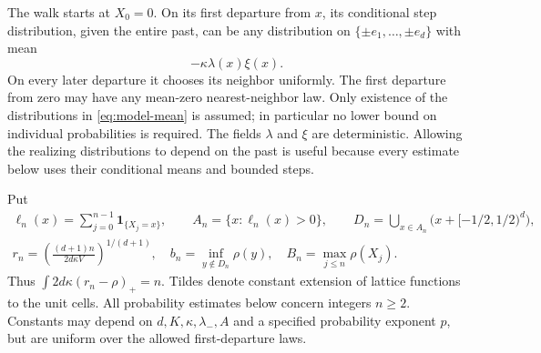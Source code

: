 \documentclass[11pt]{amsart}
\theoremstyle{plain}
\theoremstyle{definition}
\numberwithin{equation}{section}
\newcommand{\ind}{\mathbf1}
\begin{document}
The walk starts at $X_0=0$. On its first departure from $x$, its
conditional step distribution, given the entire past, can be any
distribution on $\{\pm e_1,\ldots,\pm e_d\}$ with mean
\begin{equation}\label{eq:model-mean}
 -\kappa\lambda(x)\xi(x).
\end{equation}
On every later departure it chooses its neighbor uniformly. The
first departure from zero may have any mean-zero nearest-neighbor law.
Only existence of the distributions in \eqref{eq:model-mean} is
assumed; in particular no lower bound on individual probabilities is
required. The fields $\lambda$ and $\xi$ are deterministic. Allowing
the realizing distributions to depend on the past is useful because
every estimate below uses their conditional means and bounded steps.

Put
\begin{gather}
 \ell_n(x)=\sum_{j=0}^{n-1}\ind_{\{X_j=x\}},\qquad
 A_n=\{x:\ell_n(x)>0\},\qquad
 D_n=\bigcup_{x\in A_n}\bigl(x+[-1/2,1/2)^d\bigr),\label{eq:range-def}\\
 r_n=\left(\frac{(d+1)n}{2d\kappa V}\right)^{1/(d+1)},\quad
 b_n=\inf_{y\notin D_n}\rho(y),\quad
 B_n=\max_{j\le n}\rho(X_j).\label{eq:radius-def}
\end{gather}
Thus $\int 2d\kappa(r_n-\rho)_+=n$. Tildes denote constant extension
of lattice functions to the unit cells. All probability estimates
below concern integers $n\ge2$. Constants may depend on
$d,K,\kappa,\lambda_-,A$ and a specified probability exponent $p$,
but are uniform over the allowed first-departure laws.
\end{document}
